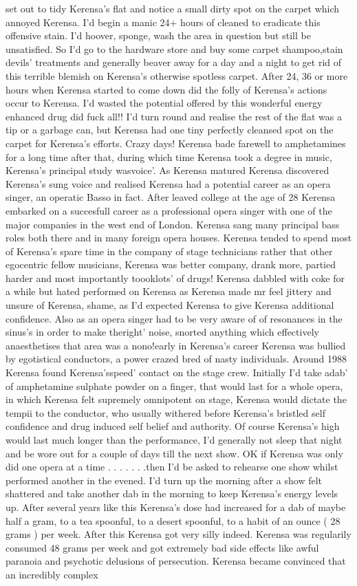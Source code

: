 \documentclass[12pt]{book}
\begin{document}
set out to tidy Kerensa's flat and notice a small dirty spot on the carpet which annoyed Kerensa. I'd begin a manic 24+ hours of cleaned to eradicate this offensive stain. I'd hoover, sponge, wash the area in question but still be unsatisfied. So I'd go to the hardware store and buy some carpet shampoo,stain devils' treatments and generally beaver away for a day and a night to get rid of this terrible blemish on Kerensa's otherwise spotless carpet. After 24, 36 or more hours when Kerensa started to come down did the folly of Kerensa's actions occur to Kerensa. I'd wasted the potential offered by this wonderful energy enhanced drug did fuck all!! I'd turn round and realise the rest of the flat was a tip or a garbage can, but Kerensa had one tiny perfectly cleansed spot on the carpet for Kerensa's efforts. Crazy days! Kerensa bade farewell to amphetamines for a long time after that, during which time Kerensa took a degree in music, Kerensa's principal study wasvoice'. As Kerensa matured Kerensa discovered Kerensa's sung voice and realised Kerensa had a potential career as an opera singer, an operatic Basso in fact. After leaved college at the age of 28 Kerensa embarked on a succesfull career as a professional opera singer with one of the major companies in the west end of London. Kerensa sang many principal bass roles both there and in many foreign opera houses. Kerensa tended to spend most of Kerensa's spare time in the company of stage technicians rather that other egocentric fellow musicians, Kerensa was better company, drank more, partied harder and most importantly toooklots' of drugs! Kerensa dabbled with coke for a while but hated performed on Kerensa as Kerensa made mr feel jittery and unsure of Kerensa, shame, as I'd expected Kerensa to give Kerensa additional confidence. Also as an opera singer had to be very aware of of resonances in the sinus's in order to make theright' noise, snorted anything which effectively anaesthetises that area was a nono!early in Kerensa's career Kerensa was bullied by egotistical conductors, a power crazed bred of nasty individuals. Around 1988 Kerensa found Kerensa'sspeed' contact on the stage crew. Initially I'd take adab' of amphetamine sulphate powder on a finger, that would last for a whole opera, in which Kerensa felt supremely omnipotent on stage, Kerensa would dictate the tempii to the conductor, who usually withered before Kerensa's bristled self confidence and drug induced self belief and authority. Of course Kerensa's high would last much longer than the performance, I'd generally not sleep that night and be wore out for a couple of days till the next show. OK if Kerensa was only did one opera at a time . . .   . . .  .then I'd be asked to rehearse one show whilst performed another in the evened. I'd turn up the morning after a show felt shattered and take another dab in the morning to keep Kerensa's energy levels up. After several years like this Kerensa's dose had increased for a dab of maybe half a gram, to a tea spoonful, to a desert spoonful, to a habit of an ounce ( 28 grams ) per week. After this Kerensa got very silly indeed. Kerensa was regularily consumed 48 grams per week and got extremely bad side effects like awful paranoia and psychotic delusions of persecution. Kerensa became convinced that an incredibly complex 
\end{document}
